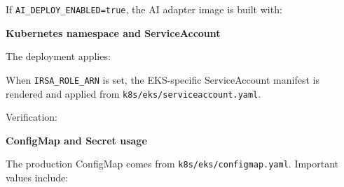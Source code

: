If \texttt{AI\_\allowbreak{}DEPLOY\_\allowbreak{}ENABLED=true}, the AI adapter image is built
with:

\begin{Shaded}
\begin{Highlighting}[]
 \OperatorTok{\textless{}}\OperatorTok{\textgreater{}}
\OperatorTok{\textless{}}\OperatorTok{\textgreater{}}
\end{Highlighting}
\end{Shaded}

\vspace{0.5em}\noindent\textbf{Kubernetes namespace and
ServiceAccount}\par

The deployment applies:

\begin{Shaded}
\begin{Highlighting}[]
\end{Highlighting}
\end{Shaded}

When \texttt{IRSA\_\allowbreak{}ROLE\_\allowbreak{}ARN} is set, the EKS-specific ServiceAccount
manifest is rendered and applied from
\texttt{k8s/\allowbreak{}eks/\allowbreak{}serviceaccount.\allowbreak{}yaml}.

Verification:

\begin{Shaded}
\begin{Highlighting}[]
\end{Highlighting}
\end{Shaded}

\vspace{0.5em}\noindent\textbf{ConfigMap and Secret
usage}\par

The production ConfigMap comes from \texttt{k8s/\allowbreak{}eks/\allowbreak{}configmap.\allowbreak{}yaml}.
Important values include:

